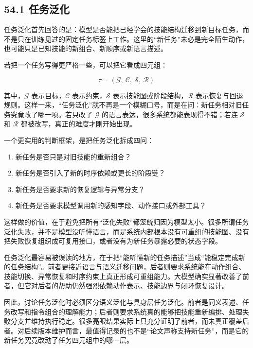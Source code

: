 \subsection*{54.1 任务泛化}


任务泛化首先回答的是：模型是否能把已经学会的技能结构迁移到新目标任务，而不是只在训练见过的固定任务标签上工作。这里的“新任务”未必是完全陌生动作，也可能只是已知技能的新组合、新顺序或新语言描述。

若把一个任务写得更严格一些，可以把它看成四元组：

\begingroup
\footnotesize
\begin{equation*}
\tau = (\mathcal{G},\ \mathcal{C},\ \mathcal{S},\ \mathcal{R})
\end{equation*}
\endgroup

其中，\(\mathcal{G}\) 表示目标，\(\mathcal{C}\) 表示约束，\(\mathcal{S}\) 表示技能图或阶段结构，\(\mathcal{R}\) 表示恢复与回退规则。这样一来，“任务泛化”就不再是一个模糊口号，而是在问：新任务相对旧任务究竟改了哪一项。若只改了 \(\mathcal{G}\) 的语言表达，很多系统都能表现得不错；若连 \(\mathcal{S}\) 和 \(\mathcal{R}\) 都被改写，真正的难度才刚开始出现。

一个更实用的判断框架，是把任务泛化拆成四问：

\begin{enumerate}
\item 新任务是否只是对旧技能的重新组合？
\item 新任务是否引入了新的时序依赖或更长的阶段链？
\item 新任务是否要求新的恢复逻辑与异常分支？
\item 新任务是否要求模型调用新的感知字段、动作接口或外部工具？
\end{enumerate}

这样做的价值，在于避免把所有“泛化失败”都笼统归因为模型太小。很多所谓任务泛化失败，并不是模型没听懂语言，而是系统内部根本没有可重组的技能图、没有把失败恢复组织成可复用接口，或者没有为新任务暴露必要的状态字段。

任务泛化最容易被误读的地方，在于把“能听懂新的任务描述”当成“能稳定完成新的任务结构”。前者更接近语言与语义迁移问题，后者则要求系统能在动作组合、技能切换、异常恢复和时序约束上真正形成可重组能力。大模型确实显著改善了前者，但它对后者的帮助仍然强烈依赖动作表示、技能边界与闭环恢复设计。

因此，讨论任务泛化时必须区分语义泛化与具身层任务泛化。前者是同义表述、任务改写和指令组合的理解能力；后者则要求系统真的能够把技能重新编排、处理失败分支并维持执行稳定。很多亮眼结果实际上只充分证明了前者，而未真正覆盖后者。对后续版本维护而言，最值得记录的也不是“论文声称支持新任务”，而是它的新任务究竟改动了任务四元组中的哪一层。


